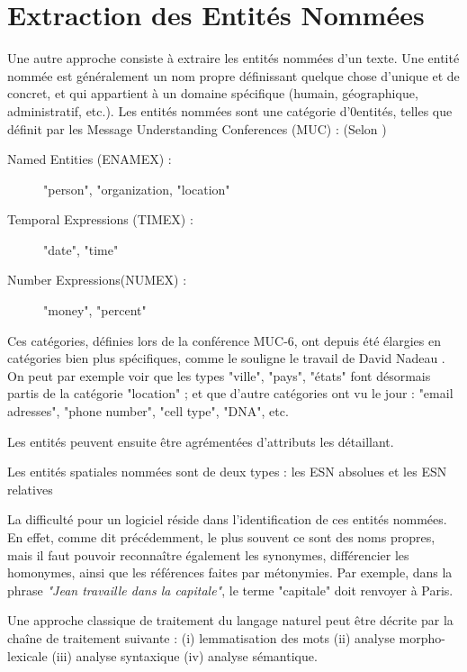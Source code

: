 \documentclass[a4paper]{book}
\begin{document}
\section{Extraction des Entités Nommées}

Une autre approche consiste à extraire les entités nommées d'un texte. Une entité nommée est généralement un nom propre définissant quelque chose d'unique et de concret, et qui appartient à un domaine spécifique (humain, géographique, administratif, etc.). Les entités nommées sont une catégorie d'0entités, telles que définit par les Message Understanding Conferences (MUC) : (Selon \cite{chinchor1998overview}) 
\begin{description}
\item[Named Entities (ENAMEX) :]{ "person", "organization, "location"}
\item[Temporal Expressions (TIMEX) :]{"date", "time"}
\item[Number Expressions(NUMEX) :]{"money", "percent"}
\end{description}

Ces catégories, définies lors de la conférence MUC-6, ont depuis été élargies en catégories bien plus spécifiques, comme le souligne le travail de David Nadeau \cite{nadeau2007survey}. On peut par exemple voir que les types "ville", "pays", "états" font désormais partis de la catégorie "location" ; et que d'autre catégories ont vu le jour : "email adresses", "phone number", "cell type", "DNA", etc.

Les entités peuvent ensuite être agrémentées d'attributs les détaillant.


Les entités spatiales nommées  sont de deux types : les ESN absolues et les ESN relatives





La difficulté pour un logiciel réside dans l'identification de ces entités nommées. En effet, comme dit précédemment, le plus souvent ce sont des noms propres, mais il faut pouvoir reconnaître également les synonymes, différencier les homonymes, ainsi que les références faites par métonymies. Par exemple, dans la phrase \textit{"Jean travaille dans la capitale"}, le terme "capitale" doit renvoyer à Paris. 

\bigbreak

Une approche classique de traitement du langage naturel peut être décrite par la chaîne de traitement suivante : (i) lemmatisation des mots (ii) analyse morpho-lexicale (iii) analyse syntaxique (iv) analyse sémantique. \cite{ABOL2003}
\end{document}

